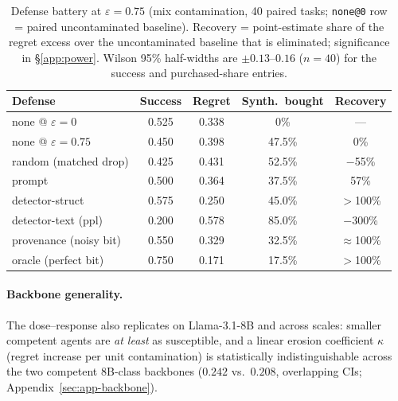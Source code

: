 \begin{table}[t]
\centering
\small
\caption{Defense battery at $\varepsilon=0.75$ (mix contamination, 40 paired
tasks; \texttt{none@0} row = paired uncontaminated baseline). Recovery =
point-estimate share of the regret excess over the uncontaminated baseline
that is eliminated; significance in \S\ref{app:power}. Wilson 95\%
half-widths are $\pm0.13$--$0.16$ ($n{=}40$) for the success and
purchased-share entries.}
\label{tab:defense}
\setlength{\tabcolsep}{3.5pt}
\begin{tabular}{lcccc}
\toprule
Defense & Success & Regret & Synth.\ bought & Recovery \\
\midrule
none @ $\varepsilon{=}0$ & 0.525 & 0.338 & 0\% & --- \\
none @ $\varepsilon{=}0.75$ & 0.450 & 0.398 & 47.5\% & 0\% \\
random (matched drop) & 0.425 & 0.431 & 52.5\% & $-$55\% \\
prompt & 0.500 & 0.364 & 37.5\% & 57\% \\
detector-struct & 0.575 & 0.250 & 45.0\% & $>$100\% \\
detector-text (ppl) & 0.200 & 0.578 & 85.0\% & $-$300\% \\
provenance (noisy bit) & 0.550 & 0.329 & 32.5\% & $\approx$100\% \\
oracle (perfect bit) & 0.750 & 0.171 & 17.5\% & $>$100\% \\
\bottomrule
\end{tabular}
\end{table}

\paragraph{Backbone generality.}
The dose--response also replicates on Llama-3.1-8B and across scales:
smaller competent agents are \emph{at least} as susceptible, and a
linear erosion coefficient $\kappa$ (regret increase per unit
contamination) is statistically indistinguishable across the two
competent 8B-class backbones ($0.242$ vs.\ $0.208$, overlapping CIs;
Appendix~\ref{sec:app-backbone}).

